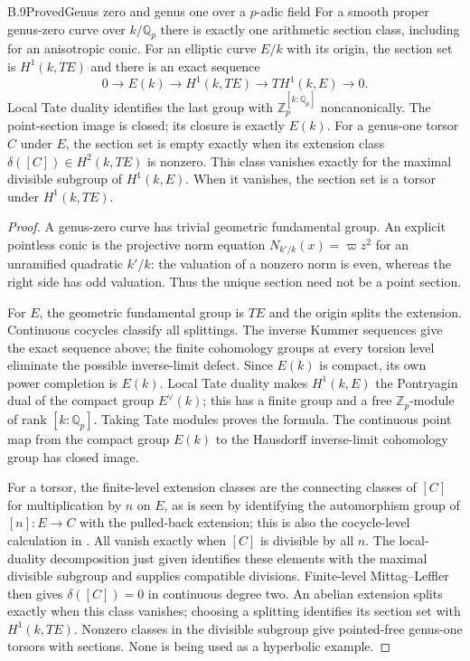 \begin{statement}{B.9}{Proved}{Genus zero and genus one over a $p$-adic field}
For a smooth proper genus-zero curve over $k/\mathbb Q_p$ there is
exactly one arithmetic section class, including for an anisotropic
conic.  For an elliptic curve $E/k$ with its origin, the section set is
$H^1(k,TE)$ and there is an exact sequence
\[
 0\longrightarrow E(k)\longrightarrow H^1(k,TE)
 \longrightarrow T H^1(k,E)\longrightarrow0.
\]
Local Tate duality identifies the last group with
$\mathbb Z_p^{[k:\mathbb Q_p]}$ noncanonically.
The point-section image is closed; its closure is exactly $E(k)$.
For a genus-one torsor $C$ under $E$, the section set is empty exactly
when its extension class $\delta([C])\in H^2(k,TE)$ is nonzero.
This class vanishes exactly for the maximal divisible subgroup of
$H^1(k,E)$.  When it vanishes, the section set is a torsor under
$H^1(k,TE)$.
\end{statement}
\begin{proof}
A genus-zero curve has trivial geometric fundamental group.
An explicit pointless conic is the projective norm equation
$N_{k'/k}(x)=\varpi z^2$ for an unramified quadratic $k'/k$:
the valuation of a nonzero norm is even, whereas the right side has
odd valuation.  Thus the unique section need not be a point section.

For $E$, the geometric fundamental group is $TE$ and the origin
splits the extension.  Continuous cocycles classify all splittings.
The inverse Kummer sequences give the exact sequence above;
the finite cohomology groups at every torsion level eliminate the
possible inverse-limit defect.  Since $E(k)$ is compact, its own
power completion is $E(k)$.  Local Tate duality makes $H^1(k,E)$
the Pontryagin dual of the compact group $E^\vee(k)$; this has a
finite group and a free $\mathbb Z_p$-module of rank $[k:\mathbb Q_p]$.
Taking Tate modules proves the formula.  The continuous point map
from the compact group $E(k)$ to the Hausdorff inverse-limit
cohomology group has closed image.

For a torsor, the finite-level extension classes are the connecting
classes of $[C]$ for multiplication by $n$ on $E$, as is seen by
identifying the automorphism group of $[n]:E\to C$ with the pulled-back
extension; this is also the cocycle-level calculation in
\cite[Proposition 2.2]{B_HarariSzamuely}.  All vanish exactly
when $[C]$ is divisible by all $n$.  The local-duality decomposition
just given identifies these elements with the maximal divisible
subgroup and supplies compatible divisions.  Finite-level
Mittag--Leffler then gives $\delta([C])=0$ in continuous degree two.
An abelian extension splits exactly when this class vanishes;
choosing a splitting identifies its section set with $H^1(k,TE)$.
Nonzero classes in the divisible subgroup give pointed-free genus-one
torsors with sections.  None is being used as a hyperbolic example.
\end{proof}


